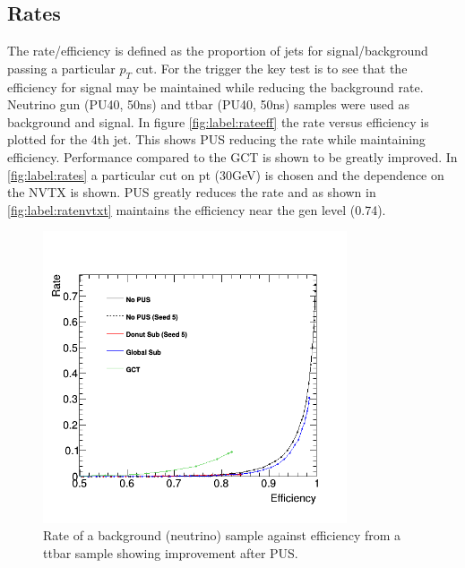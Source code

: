 \subsection{Rates}
The rate/efficiency is defined as the proportion of jets for signal/background passing a particular $p_{T}$ cut. For the trigger the key test is to see that the efficiency for signal may be maintained while reducing the background rate. Neutrino gun (PU40, 50ns) and ttbar (PU40, 50ns) samples were used as background and signal. In figure \ref{fig:label:rateeff} the rate versus efficiency is plotted for the 4th jet. This shows PUS reducing the rate while maintaining efficiency. Performance compared to the GCT is shown to be greatly improved. In \ref{fig:label:rates} a particular cut on pt (30GeV) is chosen and the dependence on the NVTX is shown. PUS greatly reduces the rate and as shown in \ref{fig:label:ratenvtxt} maintains the efficiency near the gen level (0.74).
\begin{figure}
\centering
    \includegraphics[width=0.8\textwidth]{Figures/rateeffjet4}
  \caption{Rate of a background (neutrino) sample against efficiency from a ttbar sample showing improvement after PUS.}
  \label{rateff}
\end{figure}
